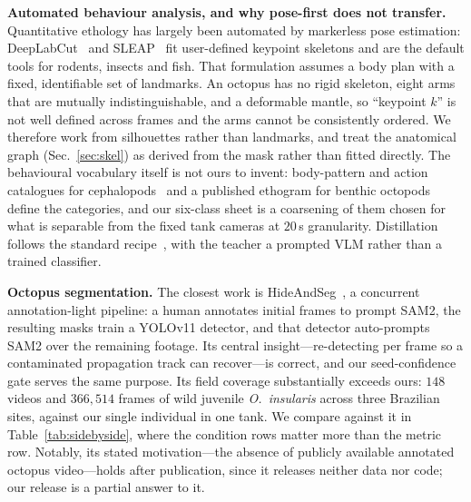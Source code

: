 \documentclass[conference]{IEEEtran}
\begin{document}
\textbf{Automated behaviour analysis, and why pose-first does not transfer.}
Quantitative ethology has largely been automated by markerless pose estimation:
DeepLabCut~\cite{deeplabcut} and SLEAP~\cite{sleap} fit user-defined keypoint
skeletons and are the default tools for rodents, insects and fish. That
formulation assumes a body plan with a fixed, identifiable set of landmarks. An
octopus has no rigid skeleton, eight arms that are mutually
indistinguishable, and a deformable mantle, so ``keypoint $k$'' is not
well defined across frames and the arms cannot be consistently ordered. We
therefore work from silhouettes rather than landmarks, and treat the anatomical
graph (Sec.~\ref{sec:skel}) as derived from the mask rather than fitted
directly. The behavioural vocabulary itself is not ours to invent: body-pattern
and action catalogues for cephalopods~\cite{borrelli} and a published ethogram
for benthic octopods~\cite{mather} define the categories, and our six-class
sheet is a coarsening of them chosen for what is separable from the
fixed tank cameras at $20$\,s granularity. Distillation follows the standard
recipe~\cite{hinton}, with the teacher a prompted VLM rather than a trained
classifier.

\textbf{Octopus segmentation.} The closest work is
HideAndSeg~\cite{hideandseg}, a concurrent annotation-light pipeline: a human
annotates initial frames to prompt SAM2, the resulting masks train a YOLOv11
detector, and that detector auto-prompts SAM2 over the remaining footage. Its
central insight---re-detecting per frame so a contaminated propagation track can
recover---is correct, and our seed-confidence gate serves the same purpose. Its
field coverage substantially exceeds ours: $148$ videos and $366{,}514$ frames of
wild juvenile \emph{O.\ insularis} across three Brazilian sites, against our
single individual in one tank. We compare against it in
Table~\ref{tab:sidebyside}, where the condition rows matter more than the metric
row. Notably, its stated motivation---the absence of publicly available
annotated octopus video---holds after publication, since it releases neither data
nor code; our release is a partial answer to it.
\end{document}
